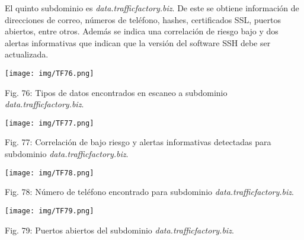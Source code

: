 \documentclass[12pt,oneside,a4paper]{book}
\begin{document}
\hspace{20pt}
El quinto subdominio es \textit{data.trafficfactory.biz}. De este se obtiene información de direcciones de correo, números de teléfono, hashes, certificados SSL, puertos abiertos, entre otros. Además se indica una correlación de riesgo bajo y dos alertas informativas que indican que la versión del software SSH debe ser actualizada.

\vspace{2em}

\begin{center}
	\texttt{[image: img/TF76.png]}
    
\vspace{0.1em}
    
    Fig. 76: Tipos de datos encontrados en escaneo a subdominio \textit{data.trafficfactory.biz}.
\end{center}

\vspace{2em}

\begin{center}
	\texttt{[image: img/TF77.png]}
    
\vspace{0.1em}
    
    Fig. 77: Correlación de bajo riesgo y alertas informativas detectadas para subdominio \textit{data.trafficfactory.biz}.
\end{center}

\vspace{2em}

\begin{center}
	\texttt{[image: img/TF78.png]}
    
\vspace{0.1em}
    
    Fig. 78: Número de teléfono encontrado para subdominio \textit{data.trafficfactory.biz}.
\end{center}

\vspace{2em}

\begin{center}
	\texttt{[image: img/TF79.png]}
    
\vspace{0.1em}
    
    Fig. 79: Puertos abiertos del subdominio \textit{data.trafficfactory.biz}.
\end{center}

\vspace{2em}
\end{document}
